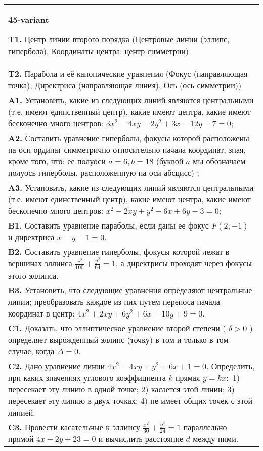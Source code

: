\documentclass{article}
\begin{document}
\begin{tabular}{m{17cm}}
\textbf{45-variant}
\newline

\textbf{T1.} Центр линии второго порядка (Центровые линии (эллипс, гипербола), Координаты центра: центр симметрии) \\
\textbf{T2.} Парабола и её канонические уравнения (Фокус (направляющая точка), Директриса (направляющая линия), Ось (ось симметрии)) \\
\textbf{A1.} Установить, какие из следующих линий являются центральными (т.е. имеют единственный центр), какие имеют центра, какие имеют бесконечно много центров: $3 x^2-4 x y-2 y^2+3 x-12 y-7=0$; \\
\textbf{A2.} Составить уравнение гиперболы, фокусы которой расположены на оси ординат симметрично относительно начала координат, зная, кроме того, что: ее полуоси $a=6, b=18$ (буквой $a$ мы обозначаем полуось гинерболы, расположенную на оси абсцисс) ; \\
\textbf{A3.} Установить, какие из следующих линий являются центральными (т.е. имеют единственный центр), какие имеют центра, какие имеют бесконечно много центров: $x^2-2 x y+y^2-6 x+6 y-3=0$; \\
\textbf{B1.} Составить уравнение параболы, если даны ее фокус $F(2 ;-1)$ и директриса $x-y-1=0$. \\
\textbf{B2.} Составить уравнение гиперболы, фокусы которой лежат в вершинах эллинса $\frac{x^2}{100}+\frac{y^2}{64}=1$, а директрисы проходят через фокусы этого эллипса. \\
\textbf{B3.} Установить, что следующие уравнения определяют центральные линии; преобразовать каждое из них путем переноса начала координат в центр: $4 x^2+2 x y+6 y^2+6 x-10 y+9=0$. \\
\textbf{C1.} Доказать, что эллиптическое уравнение второй степени ( $\delta>0$ ) определяет вырожденный эллипс (точку) в том и только в том случае, когда $\Delta=0$. \\
\textbf{C2.} Дано уравнение линии $4 x^2-4 x y+y^2+6 x+1=0$. Определить, при каких значениях углового коэффициента $k$ прямая $y=k x:$ 1) пересекает эту линию в одной точке; 2) касается этой линии; 3) пересекает эту линию в двух точках; 4) не имеет общих точек с этой линией. \\
\textbf{C3.} Провести касательные к эллиису $\frac{x^2}{30}+\frac{y^2}{24}=1$ параллельно прямой $4 x-2 y+23=0$ и вычислить расстояние $d$ между ними. \\

\end{tabular}
\vspace{1cm}
\end{document}
